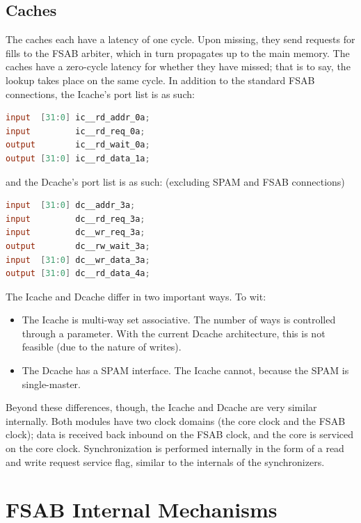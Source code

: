 \documentclass[10pt]{article}
\begin{document}
\subsection{Caches}
The caches each have a latency of one cycle. Upon missing, they send
requests for fills to the FSAB arbiter, which in turn propagates up to the
main memory. The caches have a zero-cycle latency for whether they have
missed; that is to say, the lookup takes place on the same cycle. In
addition to the standard FSAB connections, the Icache's port list is as
such:

\begin{lstlisting}[basicstyle=\footnotesize,language=Verilog]
input  [31:0] ic__rd_addr_0a;
input         ic__rd_req_0a;
output        ic__rd_wait_0a;
output [31:0] ic__rd_data_1a;
\end{lstlisting}

and the Dcache's port list is as such: (excluding SPAM and FSAB connections)

\begin{lstlisting}[basicstyle=\footnotesize,language=Verilog]
input  [31:0] dc__addr_3a;
input         dc__rd_req_3a;
input         dc__wr_req_3a;
output        dc__rw_wait_3a;
input  [31:0] dc__wr_data_3a;
output [31:0] dc__rd_data_4a;
\end{lstlisting}

The Icache and Dcache differ in two important ways. To wit:

\begin{itemize}
\item{The Icache is multi-way set associative. The number of ways is
controlled through a parameter. With the current Dcache architecture, this
is not feasible (due to the nature of writes).}
\item{The Dcache has a SPAM interface. The Icache cannot, because the SPAM
is single-master.}
\end{itemize}

Beyond these differences, though, the Icache and Dcache are very similar
internally. Both modules have two clock domains (the core clock and the FSAB
clock); data is received back inbound on the FSAB clock, and the core is
serviced on the core clock. Synchronization is performed internally in the
form of a read and write request service flag, similar to the internals of
the synchronizers.

\section{FSAB Internal Mechanisms}
\label{sec:fsabinternal}
\end{document}
